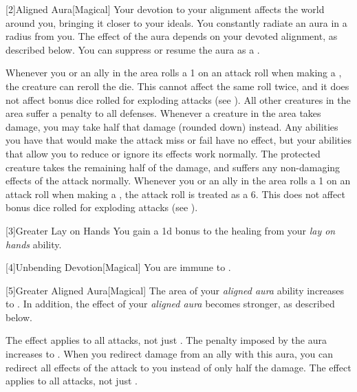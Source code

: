         [2]{Aligned Aura}[Magical]
        Your devotion to your alignment affects the world around you, bringing it closer to your ideals.
        You constantly radiate an aura in a \areamed radius  from you.
        The effect of the aura depends on your devoted alignment, as described below.
        You can suppress or resume the aura as a .

         Whenever you or an ally in the area rolls a 1 on an attack roll when making a , the creature can reroll the die.
        This cannot affect the same roll twice, and it does not affect bonus dice rolled for exploding attacks (see ).
         All other creatures in the area suffer a  penalty to all defenses.
         Whenever a creature in the area takes damage, you may take half that damage (rounded down) instead.
        Any abilities you have that would make the attack miss or fail have no effect, but your abilities that allow you to reduce or ignore its effects work normally.
        The protected creature takes the remaining half of the damage, and suffers any non-damaging effects of the attack normally.
         Whenever you or an ally in the area rolls a 1 on an attack roll when making a , the attack roll is treated as a 6.
        This does not affect bonus dice rolled for exploding attacks (see ).

        [3]{Greater Lay on Hands} 
        You gain a \plus1d bonus to the healing from your \textit{lay on hands} ability.

        [4]{Unbending Devotion}[Magical]
        You are immune to  .

        [5]{Greater Aligned Aura}[Magical]
        The area of your \textit{aligned aura} ability increases to \arealarge.
        In addition, the effect of your \textit{aligned aura} becomes stronger, as described below.

         The effect applies to all attacks, not just .
         The penalty imposed by the aura increases to .
         When you redirect damage from an ally with this aura, you can redirect all effects of the attack to you instead of only half the damage.
         The effect applies to all attacks, not just .

